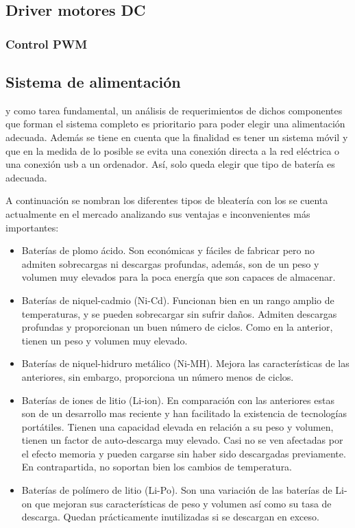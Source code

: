 \subsection{Driver motores DC} \label{sec:driver_motores}


\subsubsection{Control PWM}
\subsection{Sistema de alimentación}
y como tarea fundamental, un análisis de requerimientos de dichos componentes que forman el sistema completo es prioritario para poder elegir una alimentación adecuada. Además se tiene en cuenta que la finalidad es tener un sistema móvil y que en la medida de lo posible se evita una conexión directa a la red eléctrica o una conexión usb a un ordenador. Así, solo queda elegir que tipo de batería es adecuada. \newline

A continuación se nombran los diferentes tipos de bleatería con los se cuenta actualmente en el mercado analizando sus ventajas e inconvenientes más importantes: 

\begin{itemize}
	\item Baterías de plomo ácido. Son económicas y fáciles de fabricar pero no admiten sobrecargas ni descargas profundas, además, son de un peso y volumen muy elevados para la poca energía que son capaces de almacenar.
	\item Baterías de niquel-cadmio (Ni-Cd). Funcionan bien en un rango amplio de temperaturas, y se pueden sobrecargar sin sufrir daños. Admiten descargas profundas y proporcionan un buen número de ciclos. Como en la anterior, tienen un peso y volumen muy elevado.
	\item Baterías de niquel-hidruro metálico (Ni-MH). Mejora las características de las anteriores, sin embargo, proporciona un número menos de ciclos.
	\item Baterías de iones de litio (Li-ion). En comparación con las anteriores estas son de un desarrollo mas reciente y han facilitado la existencia de tecnologías portátiles. Tienen una capacidad elevada en relación a su peso y volumen, tienen un factor de auto-descarga muy elevado. Casi no se ven afectadas por el efecto memoria y pueden cargarse sin haber sido descargadas previamente. En contrapartida, no soportan bien los cambios de temperatura. 
	\item Baterías de polímero de litio (Li-Po). Son una variación de las baterías de Li-on que mejoran sus características de peso y volumen así como su tasa de descarga. Quedan prácticamente inutilizadas si se descargan en exceso.
\end{itemize}

